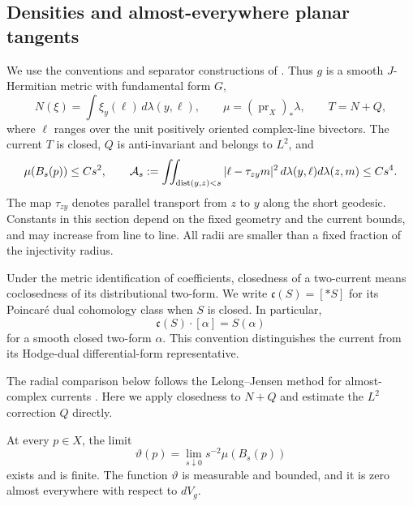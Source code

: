 \subsection{Densities and almost-everywhere planar tangents}

We use the conventions and separator constructions of
.  Thus \(g\) is a smooth
\(J\)-Hermitian metric with fundamental form \(G\),
\[
 N(\xi)=\int \xi_y(\ell)\,d\lambda(y,\ell),\qquad
 \mu=(\operatorname{pr}_X)_*\lambda,
 \qquad T=N+Q,
\]
where \(\ell\) ranges over the unit positively oriented complex-line
bivectors.  The current \(T\) is closed, \(Q\) is anti-invariant and belongs
to \(L^2\), and
\begin{equation}\label{eq:density-basic-bounds}
 \mu(B_s(p))\le Cs^2,\qquad
 \mathcal A_s:=
 \iint_{\operatorname{dist}(y,z)<s}|\ell-\tau_{zy}m|^2\,
          d\lambda(y,\ell)d\lambda(z,m)\le Cs^4.
\end{equation}
The map \(\tau_{zy}\) denotes parallel transport from \(z\) to \(y\) along
the short geodesic.  Constants in this section depend on the fixed
geometry and the current bounds, and may increase from line to line.
All radii are smaller than a fixed fraction of the injectivity radius.

Under the metric identification of coefficients, closedness of a
two-current means coclosedness of its distributional two-form.  We write
\(\mathfrak c(S)=[*S]\) for its Poincar\'e dual cohomology class when \(S\)
is closed.  In particular,
\begin{equation}\label{eq:density-intersection-convention}
 \mathfrak c(S)\cdot[\alpha]=S(\alpha)
\end{equation}
for a smooth closed two-form \(\alpha\).  This convention distinguishes
the current from its Hodge-dual differential-form representative.

The radial comparison below follows the Lelong--Jensen method for
almost-complex currents
\cite[Proposition~1 and Corollary~2]{ElkhadhraMimouni2007}.
Here we apply closedness to \(N+Q\) and estimate the \(L^2\)
correction \(Q\) directly.

\begin{lemma}\label{lem:density-existence}
At every \(p\in X\), the limit
\begin{equation}\label{eq:density-definition}
 \vartheta(p)=\lim_{s\downarrow0}s^{-2}\mu(B_s(p))
\end{equation}
exists and is finite.  The function \(\vartheta\) is measurable and
bounded, and it is zero almost everywhere with respect to \(dV_g\).
\end{lemma}

